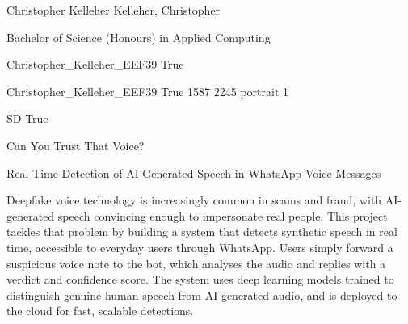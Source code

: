 \documentclass[twoside]{report}
\begin{document}
\begingroup{}\relax



\def\Key{Christopher_Kelleher_EEF39}

{Christopher Kelleher}
{Kelleher, Christopher}

{Bachelor of Science (Honours) in Applied Computing}

{Christopher_Kelleher_EEF39}
{True}

{Christopher_Kelleher_EEF39}
{True}
{1587}
{2245}
{portrait}
{1}

{SD}
{True}

{Can You Trust That Voice?}

{Real-Time Detection of AI-Generated Speech in WhatsApp Voice Messages}

{Deepfake voice technology is increasingly common in scams and fraud, with AI-generated 
speech convincing enough to impersonate real people. This project tackles that problem by 
building a system that detects synthetic speech in real time, accessible to everyday users 
through WhatsApp. Users simply forward a suspicious voice note to the bot, which analyses the 
audio and replies with a verdict and confidence score. The system uses deep learning 
models trained to distinguish genuine human speech from AI-generated audio, and is deployed 
to the cloud for fast, scalable detections.}
\end{document}
